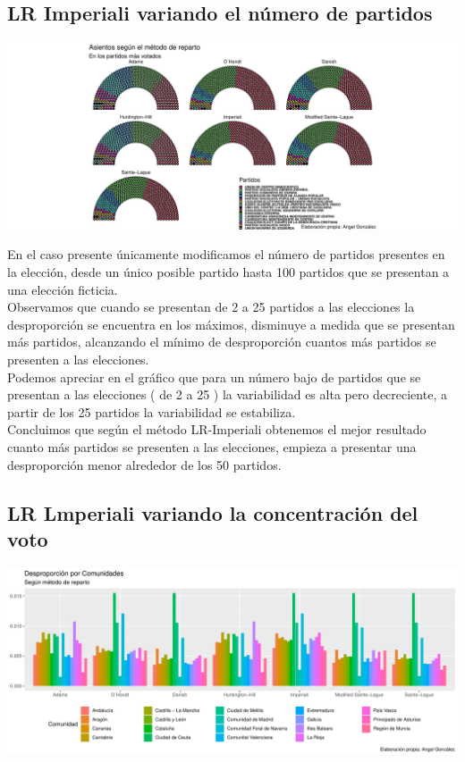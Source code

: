 \documentclass[12pt,a4paper,]{book}
\numberwithin{dummy}{section}
\theoremstyle{ocrenumbox}
\theoremstyle{blacknumex}
\theoremstyle{blacknumbox}
\theoremstyle{ocrenum}
\theoremstyle{ocrenum}
\begin{document}
\hypertarget{lr-imperiali-variando-el-nuxfamero-de-partidos}{%
\subsection{LR Imperiali variando el número de
partidos}\label{lr-imperiali-variando-el-nuxfamero-de-partidos}}

\begin{center}\includegraphics[width=0.95\linewidth]{figurasR/unnamed-chunk-62-1} \end{center}

En el caso presente únicamente modificamos el número de partidos
presentes en la elección, desde un único posible partido hasta 100
partidos que se presentan a una elección ficticia.\\
Observamos que cuando se presentan de 2 a 25 partidos a las elecciones
la desproporción se encuentra en los máximos, disminuye a medida que se
presentan más partidos, alcanzando el mínimo de desproporción cuantos
más partidos se presenten a las elecciones.\\
Podemos apreciar en el gráfico que para un número bajo de partidos que
se presentan a las elecciones ( de 2 a 25 ) la variabilidad es alta pero
decreciente, a partir de los 25 partidos la variabilidad se
estabiliza.\\
Concluimos que según el método LR-Imperiali obtenemos el mejor resultado
cuanto más partidos se presenten a las elecciones, empieza a presentar
una desproporción menor alrededor de los 50 partidos.

\hypertarget{lr-lmperiali-variando-la-concentraciuxf3n-del-voto}{%
\subsection{LR Lmperiali variando la concentración del
voto}\label{lr-lmperiali-variando-la-concentraciuxf3n-del-voto}}

\begin{center}\includegraphics[width=0.95\linewidth]{figurasR/unnamed-chunk-63-1} \end{center}
\end{document}
